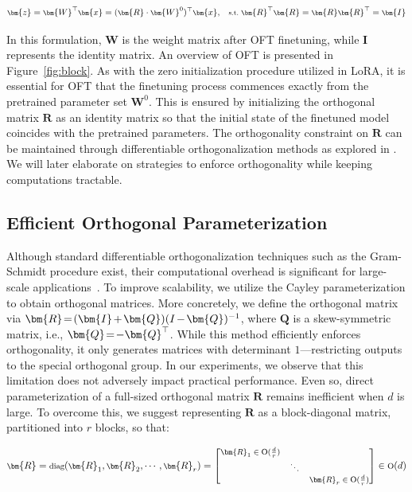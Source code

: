 \begin{equation}\label{eq:oft_general}
    \footnotesize
    \bm{z} = \bm{W}^\top \bm{x} = (\bm{R} \cdot \bm{W}^0)^\top \bm{x},~~~\text{s.t.}~\bm{R}^\top\bm{R} = \bm{R}\bm{R}^\top = \bm{I}
\end{equation}

In this formulation, $\bm{W}$ is the weight matrix after OFT finetuning, while $\bm{I}$ represents the identity matrix. An overview of OFT is presented in Figure~\ref{fig:block}. As with the zero initialization procedure utilized in LoRA, it is essential for OFT that the finetuning process commences exactly from the pretrained parameter set $\bm{W}^0$. This is ensured by initializing the orthogonal matrix $\bm{R}$ as an identity matrix so that the initial state of the finetuned model coincides with the pretrained parameters. The orthogonality constraint on $\bm{R}$ can be maintained through differentiable orthogonalization methods as explored in \cite{liu2021orthogonal,lezcano2019cheap}. We will later elaborate on strategies to enforce orthogonality while keeping computations tractable.

\subsection{Efficient Orthogonal Parameterization}\label{sect:eff_ortho}

Although standard differentiable orthogonalization techniques such as the Gram-Schmidt procedure exist, their computational overhead is significant for large-scale applications~\cite{liu2021orthogonal}. To improve scalability, we utilize the Cayley parameterization to obtain orthogonal matrices. More concretely, we define the orthogonal matrix via $\thickmuskip=2mu \medmuskip=2mu \bm{R} = (\bm{I} + \bm{Q})(I - \bm{Q})^{-1}$, where $\bm{Q}$ is a skew-symmetric matrix, i.e., $\thickmuskip=2mu \medmuskip=2mu \bm{Q} = -\bm{Q}^\top$. While this method efficiently enforces orthogonality, it only generates matrices with determinant $1$—restricting outputs to the special orthogonal group. In our experiments, we observe that this limitation does not adversely impact practical performance. Even so, direct parameterization of a full-sized orthogonal matrix $\bm{R}$ remains inefficient when $d$ is large. To overcome this, we suggest representing $\bm{R}$ as a block-diagonal matrix, partitioned into $r$ blocks, so that:

\begin{equation}
    \footnotesize
    \bm{R} = \text{diag}(\bm{R}_1, \bm{R}_2, \cdots, \bm{R}_r) = \begin{bmatrix}
    \bm{R}_1 \in \text{O}(\frac{d}{r}) &  &\\
    &\ddots & \\
    & & \bm{R}_r \in \text{O}(\frac{d}{r})
    \end{bmatrix} \in \text{O}(d)
\end{equation}

